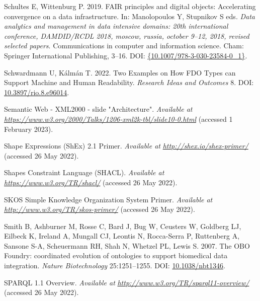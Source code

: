 \begin{CSLReferences}{1}{0}
\leavevmode{}%
Schultes E, Wittenburg P. 2019. FAIR principles and digital objects: Accelerating convergence on a data infrastructure. In: Manolopoulos Y, Stupnikov S eds. \emph{Data analytics and management in data intensive domains: 20th international conference, DAMDID/RCDL 2018, moscow, russia, october 9--12, 2018, revised selected papers}. Communications in computer and information science. Cham: Springer International Publishing, 3--16. DOI: \href{https://doi.org/\%7B10.1007/978-3-030-23584-0_1\%7D}{\{10.1007/978-3-030-23584-0\_1\}}.

\leavevmode{}%
Schwardmann U, Kálmán T. 2022. Two Examples on How FDO Types can Support Machine and Human Readability. \emph{Research Ideas and Outcomes} 8. DOI: \href{https://doi.org/10.3897/rio.8.e96014}{10.3897/rio.8.e96014}.

\leavevmode{}%
Semantic Web - XML2000 - slide "Architecture". \emph{Available at} \href{https://www.w3.org/2000/Talks/1206-xml2k-tbl/slide10-0.html}{\emph{https://www.w3.org/2000/Talks/1206-xml2k-tbl/slide10-0.html}} (accessed 1 February 2023).

\leavevmode{}%
Shape Expressions (ShEx) 2.1 Primer. \emph{Available at} \href{http://shex.io/shex-primer/}{\emph{http://shex.io/shex-primer/}} (accessed 26 May 2022).

\leavevmode{}%
Shapes Constraint Language (SHACL). \emph{Available at} \href{https://www.w3.org/TR/shacl/}{\emph{https://www.w3.org/TR/shacl/}} (accessed 26 May 2022).

\leavevmode{}%
SKOS Simple Knowledge Organization System Primer. \emph{Available at} \href{http://www.w3.org/TR/skos-primer/}{\emph{http://www.w3.org/TR/skos-primer/}} (accessed 26 May 2022).

\leavevmode{}%
Smith B, Ashburner M, Rosse C, Bard J, Bug W, Ceusters W, Goldberg LJ, Eilbeck K, Ireland A, Mungall CJ, Leontis N, Rocca-Serra P, Ruttenberg A, Sansone S-A, Scheuermann RH, Shah N, Whetzel PL, Lewis S. 2007. The OBO Foundry: coordinated evolution of ontologies to support biomedical data integration. \emph{Nature Biotechnology} 25:1251--1255. DOI: \href{https://doi.org/10.1038/nbt1346}{10.1038/nbt1346}.

\leavevmode{}%
SPARQL 1.1 Overview. \emph{Available at} \href{http://www.w3.org/TR/sparql11-overview/}{\emph{http://www.w3.org/TR/sparql11-overview/}} (accessed 26 May 2022).


\end{CSLReferences}
